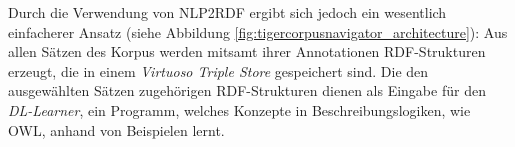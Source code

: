 Durch die Verwendung von NLP2RDF ergibt sich jedoch ein wesentlich einfacherer Ansatz (siehe Abbildung \ref{fig:tigercorpusnavigator_architecture}):
Aus allen Sätzen des Korpus werden mitsamt ihrer Annotationen RDF-Strukturen erzeugt, die in einem \emph{Virtuoso Triple Store} gespeichert sind.
Die den ausgewählten Sätzen zugehörigen RDF-Strukturen dienen als Eingabe für den \emph{DL-Learner}\footnotemark, ein Programm, welches Konzepte in Beschreibungslogiken, wie OWL, anhand von Beispielen lernt.


